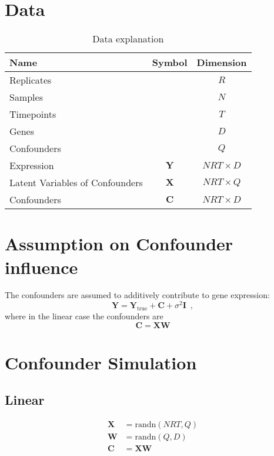 \documentclass[a4paper,tablecaptionabove]{article}
\newcommand{\matr}[1]{\ensuremath{\mathbf{#1}}}
\begin{document}
\section{Data}
\label{sec:data}

\begin{table}[h]
  \centering
  \begin{tabular}{lcc}
    \toprule
    Name & Symbol & Dimension\\
    \midrule
    Replicates && $R$  \\
    Samples && $N$ \\
    Timepoints && $T$ \\
    Genes && $D$ \\
    Confounders && $Q$ \\
    Expression & $\matr Y$ & $NRT\times D$\\
    Latent Variables of Confounders & $\matr X$ & $NRT\times Q$\\
    Confounders & $\matr C$ & $NRT\times D$\\
    \bottomrule
  \end{tabular}
  \caption{Data explanation}
  \label{tab:data}
\end{table}

\section{Assumption on Confounder influence}
\label{sec:assumpt-conf-infl}

The confounders are assumed to additively contribute to gene
expression:
\begin{equation}
  \label{eq:5}
  \matr Y = \matr Y_\text{true} + \matr C + \sigma^2\matr I\enspace,
\end{equation}
where in the linear case the confounders are
\begin{equation}
  \label{eq:6}
  \matr C = \matr{XW}
\end{equation}

\section{Confounder Simulation}
\label{sec:confounder-modelling}

\subsection{Linear}
\label{sec:linear}

\begin{align}
  \matr{X} & = \text{randn}(NRT,Q)\\
  \matr{W} & = \text{randn}(Q,D)\\
  \matr{C} & = \matr{XW}
\end{align}
\end{document}
